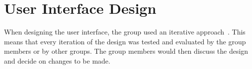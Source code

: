 \section{User Interface Design}\label{sec:user-interface-design}

When designing the user interface, the group used an iterative approach~\cite{iterative-design}.
This means that every iteration of the design was tested and evaluated by the group members or by other groups.
The group members would then discuss the design and decide on changes to be made.







